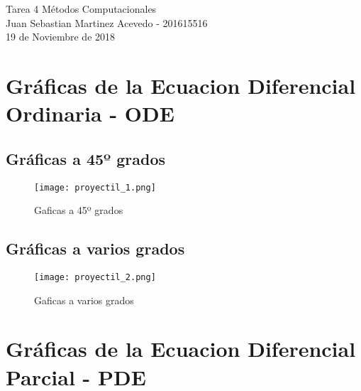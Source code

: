 \documentclass[11pt,letterpaper]{exam}
\begin{document}
\begin{center}
{\Large  Tarea 4 Métodos Computacionales} \\
Juan Sebastian Martinez Acevedo - \textsc{201615516}\\
19 de Noviembre de 2018\\
\end{center}


\noindent

\section{Gráficas de la Ecuacion Diferencial Ordinaria - ODE}
\subsection{Gráficas a 45º grados}
\begin{figure}[H]
\centering
\texttt{[image: proyectil\_1.png]}
\caption{Gaficas a 45º grados}\label{Fi:Imag3}
\end{figure}

\subsection{Gráficas a varios grados}
\begin{figure}[H]
\centering
\texttt{[image: proyectil\_2.png]}
\caption{Gaficas a varios grados}\label{Fi:Imag3}
\end{figure}

\section{Gráficas de la Ecuacion Diferencial Parcial - PDE}
\end{document}
